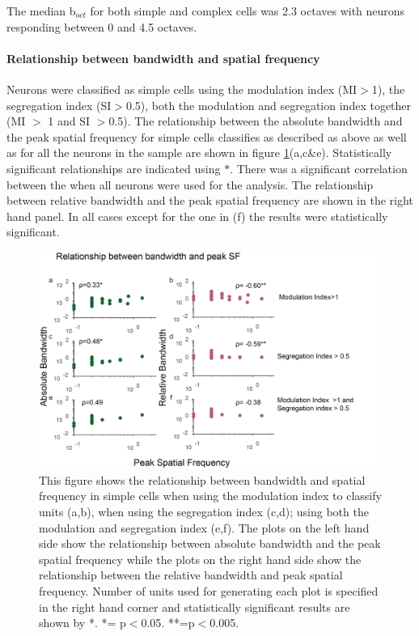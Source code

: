 	The median b$_{oct}$ for both simple and complex cells was 2.3 octaves with neurons responding between 0 and 4.5 octaves. 
	\paragraph{Relationship between bandwidth and spatial frequency}
	
	Neurons were classified as simple cells using the modulation index (MI$>$1), the segregation index (SI$>$0.5), both the modulation and segregation index together (MI $>$ 1 and SI $>$0.5). The relationship between the absolute bandwidth and the peak spatial frequency for simple cells classifies as described as above as well as for all the neurons in the sample are shown in figure \ref{fig:hwpksf}(a,c\&e). Statistically significant relationships are indicated using $*$. There was a significant correlation between the when all neurons were used for the analysis. The relationship between relative bandwidth and the peak spatial frequency are shown in the right hand panel. In all cases except for the one in (f) the results were statistically significant.
	
		\begin{figure}[]
		
		\includegraphics[width=\linewidth]{LinearV1/hwpksf2.jpg}
		\caption{This figure shows the relationship between bandwidth and spatial frequency in simple cells when using the modulation index to classify units (a,b), when using the segregation index (c,d); using both the modulation and segregation index (e,f). The plots on the left hand side show the relationship between absolute bandwidth and the peak spatial frequency while the plots on the right hand side show the relationship between the relative bandwidth and peak spatial frequency. Number of units used for generating each plot is specified in the right hand corner and statistically significant results are shown by *. *= p$<$0.05. **=p$<$0.005.}
		\label{fig:hwpksf}
		\end{figure}
	
